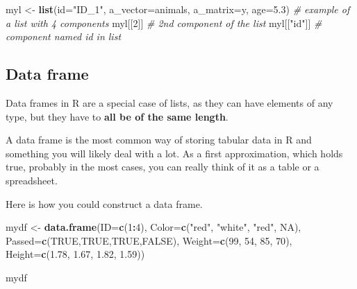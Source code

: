 \documentclass[
]{book}
\newenvironment{Shaded}{\begin{snugshade}}{\end{snugshade}}
\newcommand{\AttributeTok}[1]{\textcolor[rgb]{0.13,0.29,0.53}{#1}}
\newcommand{\CommentTok}[1]{\textcolor[rgb]{0.56,0.35,0.01}{\textit{#1}}}
\newcommand{\ConstantTok}[1]{\textcolor[rgb]{0.56,0.35,0.01}{#1}}
\newcommand{\DecValTok}[1]{\textcolor[rgb]{0.00,0.00,0.81}{#1}}
\newcommand{\FloatTok}[1]{\textcolor[rgb]{0.00,0.00,0.81}{#1}}
\newcommand{\FunctionTok}[1]{\textcolor[rgb]{0.13,0.29,0.53}{\textbf{#1}}}
\newcommand{\NormalTok}[1]{#1}
\newcommand{\OtherTok}[1]{\textcolor[rgb]{0.56,0.35,0.01}{#1}}
\newcommand{\SpecialCharTok}[1]{\textcolor[rgb]{0.81,0.36,0.00}{\textbf{#1}}}
\newcommand{\StringTok}[1]{\textcolor[rgb]{0.31,0.60,0.02}{#1}}
\begin{document}
\begin{Shaded}
\begin{Highlighting}[]
\NormalTok{myl }\OtherTok{\textless{}{-}} \FunctionTok{list}\NormalTok{(}\AttributeTok{id=}\StringTok{"ID\_1"}\NormalTok{, }\AttributeTok{a\_vector=}\NormalTok{animals, }\AttributeTok{a\_matrix=}\NormalTok{y, }\AttributeTok{age=}\FloatTok{5.3}\NormalTok{) }\CommentTok{\# example of a list with 4 components}
\NormalTok{myl[[}\DecValTok{2}\NormalTok{]] }\CommentTok{\# 2nd component of the list}
\NormalTok{myl[[}\StringTok{"id"}\NormalTok{]] }\CommentTok{\# component named id in list}
\end{Highlighting}
\end{Shaded}

\subsection{Data frame}\label{data-frame}

Data frames in R are a special case of lists, as they can have elements of any type, but they have to \textbf{all be of the same length}.

A data frame is the most common way of storing tabular data in R and something you will likely deal with a lot. As a first approximation, which holds true, probably in the most cases, you can really think of it as a table or a spreadsheet.

Here is how you could construct a data frame.

\begin{Shaded}
\begin{Highlighting}[]
\NormalTok{mydf }\OtherTok{\textless{}{-}} \FunctionTok{data.frame}\NormalTok{(}\AttributeTok{ID=}\FunctionTok{c}\NormalTok{(}\DecValTok{1}\SpecialCharTok{:}\DecValTok{4}\NormalTok{),}
                   \AttributeTok{Color=}\FunctionTok{c}\NormalTok{(}\StringTok{"red"}\NormalTok{, }\StringTok{"white"}\NormalTok{, }\StringTok{"red"}\NormalTok{, }\ConstantTok{NA}\NormalTok{),}
                   \AttributeTok{Passed=}\FunctionTok{c}\NormalTok{(}\ConstantTok{TRUE}\NormalTok{,}\ConstantTok{TRUE}\NormalTok{,}\ConstantTok{TRUE}\NormalTok{,}\ConstantTok{FALSE}\NormalTok{),}
                   \AttributeTok{Weight=}\FunctionTok{c}\NormalTok{(}\DecValTok{99}\NormalTok{, }\DecValTok{54}\NormalTok{, }\DecValTok{85}\NormalTok{, }\DecValTok{70}\NormalTok{),}
                   \AttributeTok{Height=}\FunctionTok{c}\NormalTok{(}\FloatTok{1.78}\NormalTok{, }\FloatTok{1.67}\NormalTok{, }\FloatTok{1.82}\NormalTok{, }\FloatTok{1.59}\NormalTok{))}

\NormalTok{mydf}
\end{Highlighting}
\end{Shaded}
\end{document}
